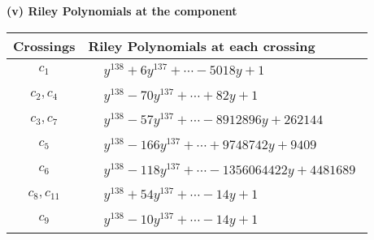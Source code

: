 \documentclass[1p]{elsarticle_modified}
\theoremstyle{definition}
\begin{document}
\newpage\renewcommand{\arraystretch}{1}
\flushleft \textbf{(v) Riley Polynomials at the component}\newline \\
\begin{tabular}{m{50pt}|m{274pt}}
Crossings & \hspace{64pt}Riley Polynomials at each crossing \\
\hline $$\begin{aligned}c_{1}\end{aligned}$$&$\begin{aligned}
&y^{138}+6 y^{137}+\cdots-5018 y+1
\end{aligned}$\\
\hline $$\begin{aligned}c_{2},c_{4}\end{aligned}$$&$\begin{aligned}
&y^{138}-70 y^{137}+\cdots+82 y+1
\end{aligned}$\\
\hline $$\begin{aligned}c_{3},c_{7}\end{aligned}$$&$\begin{aligned}
&y^{138}-57 y^{137}+\cdots-8912896 y+262144
\end{aligned}$\\
\hline $$\begin{aligned}c_{5}\end{aligned}$$&$\begin{aligned}
&y^{138}-166 y^{137}+\cdots+9748742 y+9409
\end{aligned}$\\
\hline $$\begin{aligned}c_{6}\end{aligned}$$&$\begin{aligned}
&y^{138}-118 y^{137}+\cdots-1356064422 y+4481689
\end{aligned}$\\
\hline $$\begin{aligned}c_{8},c_{11}\end{aligned}$$&$\begin{aligned}
&y^{138}+54 y^{137}+\cdots-14 y+1
\end{aligned}$\\
\hline $$\begin{aligned}c_{9}\end{aligned}$$&$\begin{aligned}
&y^{138}-10 y^{137}+\cdots-14 y+1
\end{aligned}$\\

\end{tabular}
\end{document}
